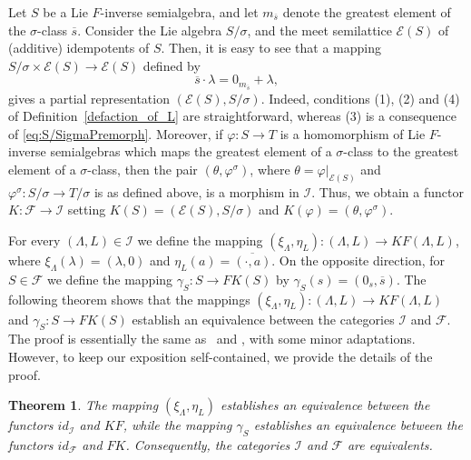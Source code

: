 \documentclass{amsart}
\newcommand{\E}{\mathcal{E}}
\newcommand{\0}{{\vartheta}}
\newtheorem{thm}{Theorem}[section]
\theoremstyle{definition}
\theoremstyle{remark}
\numberwithin{equation}{section}
\newtheorem*{Theorem A}{\textbf{Theorem A}}
\newtheorem*{Corollary E}{\textbf{Corollary E}}
\newtheorem*{Corollary F}{\textbf{Corollary F}}
\newtheorem*{Theorem B}{\textbf{Theorem B}}
\newtheorem*{Theorem C}{\textbf{Theorem C}}
\newtheorem*{Theorem D}{\textbf{Theorem B}}
\newtheorem*{p a}{\textbf{Proof of  Theorem A}}
\newtheorem*{p b}{\textbf{Proof of Theorem B}}
\newtheorem*{p c}{\textbf{Proof of  Theorem C}}
\newtheorem*{p d}{\textbf{Proof of  Theorem D}}
\begin{document}
Let $S$ be a Lie  $F$-inverse semialgebra, and let $m_{\overline{s}}$ denote the greatest element of the $\sigma$-class $\overline{s}$. Consider the Lie algebra $S/\sigma$, and the meet semilattice $\E(S)$ of (additive) idempotents of $S$. Then, it is easy to see that a mapping $S/\sigma\times \E(S)\to \E(S)$ defined by 
$$\overline{s}\cdot \lambda=0_{m_{\overline{s}}}+\lambda,$$
 gives a partial representation $(\E(S), S/\sigma)$. Indeed, conditions (1), (2) and (4) of 
 Definition~\ref{defaction_of_L} are straightforward, whereas (3) is a consequence of 
 \eqref{eq:S/SigmaPremorph}. Moreover, if $\varphi: S\to T$ is a homomorphism of Lie $F$-inverse semialgebras  which maps the greatest element of a $\sigma$-class to the greatest element of a $\sigma$-class, then the pair $(\theta,\varphi ^{\sigma})$,  where $\theta=\varphi|_{\E(S)}$ and $\varphi ^{\sigma}: S/\sigma\to T/\sigma $ is as defined above, 
  is a morphism in $\mathcal{I}.$ Thus, we obtain a functor $K:\mathcal{F}\to \mathcal{I}$ setting $K(S)=(\E(S),S/\sigma)$ and $ K(\varphi)= (\theta,\varphi ^{\sigma}).$

For every $(\Lambda,L)\in \mathcal{I}$ we define the mapping $(\xi_\Lambda,\eta_L): (\Lambda,L)\to KF(\Lambda,L)$, where $\xi_\Lambda(\lambda)=(\lambda,0)$ and $\eta_L(a)=\overline{(\cdot,a)}$. On the opposite direction, for $S\in \mathcal{F}$ we define the mapping $\gamma_S: S\to FK(S)$ by $\gamma_S(s)=(0_s,\overline{s}).$ The following theorem shows that the  mappings $(\xi_\Lambda,\eta_L): (\Lambda,L)\to KF(\Lambda,L)$ and $\gamma_S: S\to FK(S)$ establish an equivalence between the categories $\mathcal{I}$ and $\mathcal{F}$. The proof is essentially the same as~\cite[Lemma VII.6.7]{Petrich1984} and \cite[Lemma VII.6.8]{Petrich1984}, with some minor adaptations. However, to keep our exposition self-contained, we provide the details of the proof. 

\begin{thm}\label{pro-equivalence}
The mapping $(\xi_\Lambda,\eta_L)$ establishes an equivalence between the functors $id_{\mathcal{I}}$ and $KF$, while the mapping $\gamma_S$ establishes an equivalence between the functors $id_{\mathcal{F}}$ and $FK$.  Consequently, the categories $\mathcal{I}$ and $\mathcal{F}$ are equivalents.
\end{thm}
\end{document}
